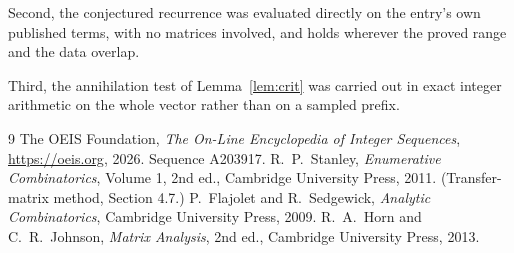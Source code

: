\documentclass[11pt,a4paper]{article}
\theoremstyle{plain}
\theoremstyle{definition}
\begin{document}
Second, the conjectured recurrence was evaluated directly on the entry's own published terms,
with no matrices involved, and holds wherever the proved range and the data overlap.

Third, the annihilation test of Lemma~\ref{lem:crit} was carried out in exact integer
arithmetic on the whole vector rather than on a sampled prefix.

\begin{thebibliography}{9}
 The OEIS Foundation, \emph{The On-Line Encyclopedia of Integer
Sequences}, \url{https://oeis.org}, 2026. Sequence A203917.
 R.~P.~Stanley, \emph{Enumerative Combinatorics}, Volume 1, 2nd ed.,
Cambridge University Press, 2011. (Transfer-matrix method, Section 4.7.)
 P.~Flajolet and R.~Sedgewick, \emph{Analytic Combinatorics}, Cambridge
University Press, 2009.
 R.~A.~Horn and C.~R.~Johnson, \emph{Matrix Analysis}, 2nd ed., Cambridge
University Press, 2013.
\end{thebibliography}
\end{document}
